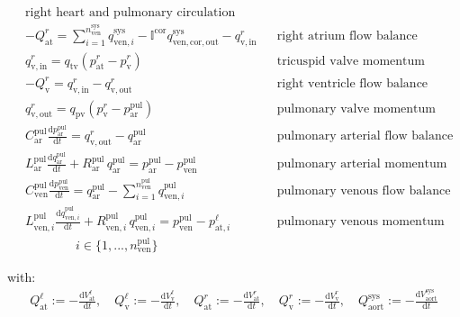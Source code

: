 \documentclass[a4paper,12pt]{report}
\begin{document}
\begin{equation}
\label{equation-syspul-2}
\begin{aligned}
&\text{right heart and pulmonary circulation} && \\
&-Q_{\mathrm{at}}^{r} = \sum\limits_{i=1}^{n_{\mathrm{ven}}^{\mathrm{sys}}}q_{\mathrm{ven},i}^{\mathrm{sys}} - \mathbb{I}^{\mathrm{cor}} q_{\mathrm{ven,cor,out}}^{\mathrm{sys}} - q_{\mathrm{v,in}}^{r} && \text{right atrium flow balance}\\
&q_{\mathrm{v,in}}^{r} = q_{\mathrm{tv}}(p_{\mathrm{at}}^{r}-p_{\mathrm{v}}^{r}) && \text{tricuspid valve momentum}\\
&-Q_{\mathrm{v}}^{r} = q_{\mathrm{v,in}}^{r} - q_{\mathrm{v,out}}^{r} && \text{right ventricle flow balance}\\
&q_{\mathrm{v,out}}^{r} = q_{\mathrm{pv}}(p_{\mathrm{v}}^{r}-p_{\mathrm{ar}}^{\mathrm{pul}}) && \text{pulmonary valve momentum}\\
&C_{\mathrm{ar}}^{\mathrm{pul}} \frac{\mathrm{d}p_{\mathrm{ar}}^{\mathrm{pul}}}{\mathrm{d}t} = q_{\mathrm{v,out}}^{r} - q_{\mathrm{ar}}^{\mathrm{pul}} && \text{pulmonary arterial flow balance}\\
&L_{\mathrm{ar}}^{\mathrm{pul}} \frac{\mathrm{d}q_{\mathrm{ar}}^{\mathrm{pul}}}{\mathrm{d}t} + R_{\mathrm{ar}}^{\mathrm{pul}}\,q_{\mathrm{ar}}^{\mathrm{pul}}=p_{\mathrm{ar}}^{\mathrm{pul}} -p_{\mathrm{ven}}^{\mathrm{pul}} && \text{pulmonary arterial momentum}\\
&C_{\mathrm{ven}}^{\mathrm{pul}} \frac{\mathrm{d}p_{\mathrm{ven}}^{\mathrm{pul}}}{\mathrm{d}t} = q_{\mathrm{ar}}^{\mathrm{pul}} - \sum\limits_{i=1}^{n_{\mathrm{ven}}^{\mathrm{pul}}}q_{\mathrm{ven},i}^{\mathrm{pul}} && \text{pulmonary venous flow balance}\nonumber\\
&L_{\mathrm{ven},i}^{\mathrm{pul}} \frac{\mathrm{d}q_{\mathrm{ven},i}^{\mathrm{pul}}}{\mathrm{d}t} + R_{\mathrm{ven},i}^{\mathrm{pul}}\, q_{\mathrm{ven},i}^{\mathrm{pul}}=p_{\mathrm{ven}}^{\mathrm{pul}}-p_{\mathrm{at},i}^{\ell} && \text{pulmonary venous momentum}\\
&\qquad\qquad i \in \{1,...,n_{\mathrm{ven}}^{\mathrm{pul}}\} && 
\end{aligned}
\end{equation}

with:
\begin{equation}
\begin{aligned}
Q_{\mathrm{at}}^{\ell} := -\frac{\mathrm{d}V_{\mathrm{at}}^{\ell}}{\mathrm{d}t}, \quad
Q_{\mathrm{v}}^{\ell} := -\frac{\mathrm{d}V_{\mathrm{v}}^{\ell}}{\mathrm{d}t}, \quad
Q_{\mathrm{at}}^{r} := -\frac{\mathrm{d}V_{\mathrm{at}}^{r}}{\mathrm{d}t}, \quad
Q_{\mathrm{v}}^{r} := -\frac{\mathrm{d}V_{\mathrm{v}}^{r}}{\mathrm{d}t},
\quad
Q_{\mathrm{aort}}^{\mathrm{sys}} := -\frac{\mathrm{d}V_{\mathrm{aort}}^{\mathrm{sys}}}{\mathrm{d}t}
\end{aligned}
\end{equation}
\end{document}
